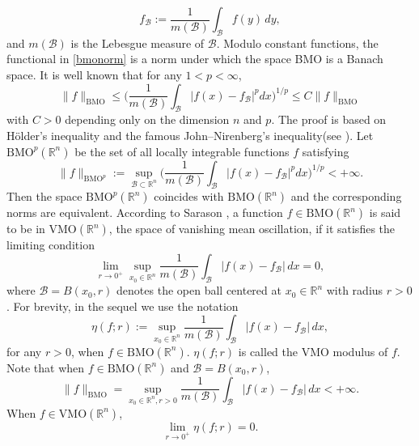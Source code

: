 \documentclass[10pt, reqno]{amsart}
\theoremstyle{definition}
\theoremstyle{remark}
\numberwithin{equation}{section}
\begin{document}
\begin{equation*}
f_{\mathcal{B}}:=\frac{1}{m(\mathcal{B})}\int_{\mathcal{B}}f(y)\,dy,
\end{equation*}
and $m(\mathcal{B})$ is the Lebesgue measure of $\mathcal{B}$. Modulo constant functions, the functional in \eqref{bmonorm} is a norm under which the space BMO is a Banach space. It is well known that for any $1<p<\infty$,
\begin{equation*}
\|f\|_{\mathrm{BMO}}\leq \bigg(\frac{1}{m(\mathcal{B})}\int_{\mathcal{B}}|f(x)-f_{\mathcal{B}}|^pdx\bigg)^{1/p}\leq C\|f\|_{\mathrm{BMO}}
\end{equation*}
with $C>0$ depending only on the dimension $n$ and $p$. The proof is based on H\"{o}lder's inequality and the famous John--Nirenberg's inequality(see \cite{john}). Let $\mathrm{BMO}^p(\mathbb R^n)$ be the set of all locally integrable functions $f$ satisfying
\begin{equation*}
\|f\|_{\mathrm{BMO}^p}:=\sup_{\mathcal{B}\subset\mathbb R^n}\bigg(\frac{1}{m(\mathcal{B})}\int_{\mathcal{B}}|f(x)-f_{\mathcal{B}}|^pdx\bigg)^{1/p}<+\infty.
\end{equation*}
Then the space $\mathrm{BMO}^p(\mathbb R^n)$ coincides with $\mathrm{BMO}(\mathbb R^n)$ and the corresponding norms are equivalent.
According to Sarason \cite{sarason}, a function $f\in \mathrm{BMO}(\mathbb R^n)$ is said to be in $\mathrm{VMO}(\mathbb R^n)$, the space of vanishing mean oscillation, if it satisﬁes the limiting condition
\begin{equation*}
\lim_{r\to 0^{+}}\sup_{x_0\in\mathbb R^n}\frac{1}{m(\mathcal{B})}\int_{\mathcal{B}}|f(x)-f_{\mathcal{B}}|\,dx=0,
\end{equation*}
where $\mathcal{B}=B(x_0,r)$ denotes the open ball centered at $x_0\in\mathbb R^n$ with radius $r>0$. For brevity, in the sequel we use the notation
\begin{equation*}
\eta(f;r):=\sup_{x_0\in\mathbb R^n}\frac{1}{m(\mathcal{B})}\int_{\mathcal{B}}|f(x)-f_{\mathcal{B}}|\,dx,
\end{equation*}
for any $r>0$, when $f\in \mathrm{BMO}(\mathbb R^n)$. $\eta(f;r)$ is called the VMO modulus of $f$. Note that when $f\in \mathrm{BMO}(\mathbb R^n)$ and $\mathcal{B}=B(x_0,r)$,
\begin{equation*}
\|f\|_{\mathrm{BMO}}=\sup_{x_0\in\mathbb R^n,r>0}\frac{1}{m(\mathcal{B})}\int_{\mathcal{B}}|f(x)-f_{\mathcal{B}}|\,dx<+\infty.
\end{equation*}
When $f\in \mathrm{VMO}(\mathbb R^n)$,
\begin{equation*}
\lim_{r\to 0^{+}}\eta(f;r)=0.
\end{equation*}
\end{document}

